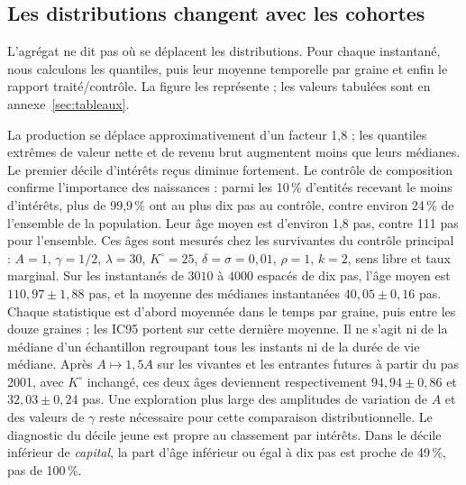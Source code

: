 \subsection{Les distributions changent avec les cohortes}\label{sec:ou}
L'agrégat ne dit pas où se déplacent les distributions. Pour chaque
instantané, nous calculons les quantiles, puis leur moyenne temporelle
par graine et enfin le rapport traité/contrôle. La figure les représente ;
les valeurs tabulées sont en annexe~\ref{sec:tableaux}.


La production se déplace approximativement d'un facteur 1,8 ; les
quantiles extrêmes de valeur nette et de revenu brut augmentent moins
que leurs médianes. Le premier décile d'intérêts reçus diminue fortement.
Le contrôle de composition confirme l'importance des naissances : parmi
les 10\,\% d'entités recevant le moins d'intérêts, plus de 99,9\,\%
ont au plus dix pas au contrôle, contre environ 24\,\% de l'ensemble
de la population. Leur âge moyen est d'environ 1,8 pas, contre 111 pas
pour l'ensemble. Ces âges sont mesurés chez les survivantes du contrôle
principal : $A=1$, $\gamma=1/2$, $\lambda=30$, $K^\circ=25$,
$\delta=\sigma=0{,}01$, $\rho=1$, $k=2$, sens libre et taux marginal.
Sur les instantanés de $3010$ à $4000$ espacés de dix pas, l'âge
moyen est $110{,}97\pm1{,}88$ pas, et la moyenne des médianes
instantanées $40{,}05\pm0{,}16$ pas. Chaque statistique est d'abord
moyennée dans le temps par graine, puis entre les douze graines ;
les IC95 portent sur cette dernière moyenne. Il ne s'agit ni de la
médiane d'un échantillon regroupant tous les instants ni de la durée
de vie médiane. Après $A\mapsto1{,}5A$ sur les vivantes et les
entrantes futures à partir du pas 2001, avec $K^\circ$ inchangé,
ces deux âges deviennent respectivement $94{,}94\pm0{,}86$ et
$32{,}03\pm0{,}24$ pas. Une exploration plus large des amplitudes
de variation de $A$ et des valeurs de $\gamma$ reste nécessaire
pour cette comparaison distributionnelle.
Le diagnostic du décile jeune est propre au classement par intérêts.
Dans le décile inférieur de \emph{capital}, la part d'âge inférieur
ou égal à dix pas est proche de 49\,\%, pas de 100\,\%.

